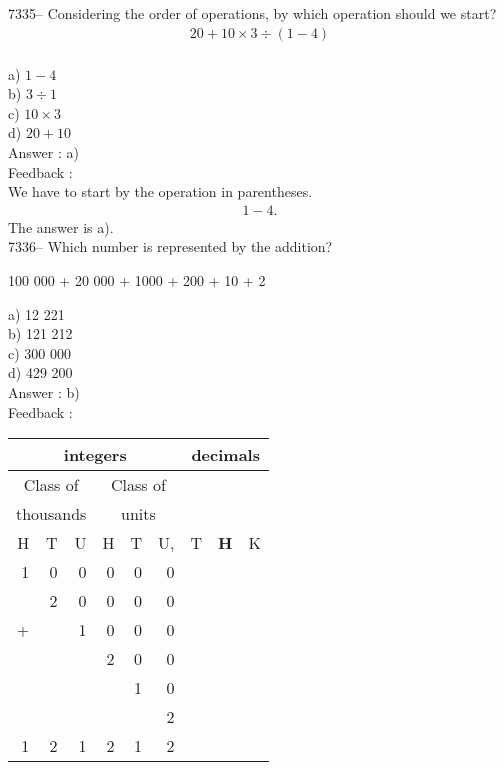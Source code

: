\documentclass[letterpaper, 12pt]{article}
\begin{document}
7335-- Considering the order of operations, by which operation should we start?\\

\begin{eqnarray*}
20+10\times3\div(1-4)\\
\end{eqnarray*}

a) $1-4$\\
b) $3\div1$\\
c) $10\times3$\\
d) $20+10$\\

Answer : a)\\

Feedback :\\
We have to start by the operation in parentheses.\\
\begin{eqnarray*}
1-4.
\end{eqnarray*}
The answer is a).\\

7336-- Which number is represented by the addition?\\
\begin{center}
100 000 + 20 000 + 1000 + 200 + 10 + 2
\end{center}

a) 12 221\\
b) 121 212\\
c) 300 000\\
d) 429 200\\

Answer : b)\\

Feedback :\\
\begin{center}
\begin{tabular}{|rrr|rrr|rrr|}
\hline
\multicolumn{6}{|c|}{integers} &\multicolumn{3}{|c|}{decimals} \\
\hline
\multicolumn{3}{|c|}{Class of} &\multicolumn{3}{|c|}{Class of} &  \multicolumn{3}{c|}{} \\
\multicolumn{3}{|c|}{thousands} &\multicolumn{3}{|c|}{units} &  \multicolumn{3}{c|}{} \\
\hline
H & T & U &H & T & U, & T\up{th} & \textbf{H\up{th}} & K\up{th} \\
\hline
\hline
1 & 0 & 0 & 0 & 0 & 0 &  &  &  \\
  & 2 & 0 & 0 & 0 & 0 &  &  &  \\
+ &   & 1 & 0 & 0 & 0 &  &  &  \\
  &   &   & 2 & 0 & 0 &  &  &  \\
  &   &   &   & 1 & 0 &  &  &  \\
  &   &   &   &   & 2 &  &  &  \\
\hline
\hline
1 & 2 & 1 & 2 & 1 & 2 &  &  &  \\
\hline
\end{tabular}
\end{center}
\end{document}
